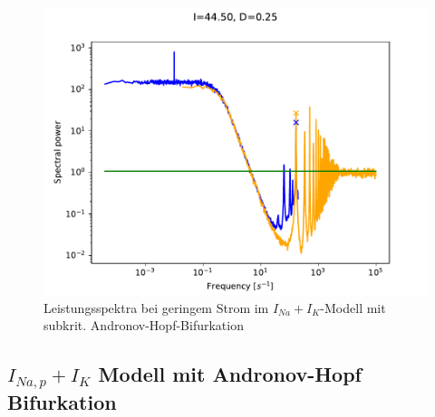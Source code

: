 \documentclass[12pt,a4paper]{article}
\begin{document}
\begin{figure}[H]
	\centering
	\includegraphics[scale=1]{twofoud25i4450ws.pdf}\caption{Leistungsspektra bei geringem Strom im $I_{Na}+I_K$-Modell mit subkrit. Andronov-Hopf-Bifurkation}
	\label{twofoud25small}
\end{figure}
\subsection{$I_{Na,p}+I_K$ Modell mit Andronov-Hopf Bifurkation}
\end{document}
